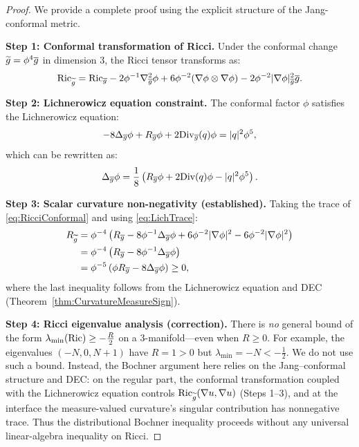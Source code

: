 \begin{proof}
We provide a complete proof using the explicit structure of the Jang-conformal metric.

\textbf{Step 1: Conformal transformation of Ricci.}
Under the conformal change $\widetilde{g} = \phi^4 \overline{g}$ in dimension 3, the Ricci tensor transforms as:
\begin{equation}\label{eq:RicciConformal}
    \mathrm{Ric}_{\widetilde{g}} = \mathrm{Ric}_{\overline{g}} - 2\phi^{-1}\nabla^2_{\overline{g}}\phi + 6\phi^{-2}(\nabla\phi \otimes \nabla\phi) - 2\phi^{-2}|\nabla\phi|^2_{\overline{g}} \overline{g}.
\end{equation}

\textbf{Step 2: Lichnerowicz equation constraint.}
The conformal factor $\phi$ satisfies the Lichnerowicz equation:
\begin{equation}
    -8\Delta_{\overline{g}}\phi + R_{\overline{g}}\phi + 2\text{Div}_{\overline{g}}(q)\phi = |q|^2\phi^5,
\end{equation}
which can be rewritten as:
\begin{equation}\label{eq:LichTrace}
    \Delta_{\overline{g}}\phi = \frac{1}{8}\left(R_{\overline{g}}\phi + 2\text{Div}(q)\phi - |q|^2\phi^5\right).
\end{equation}

\textbf{Step 3: Scalar curvature non-negativity (established).}
Taking the trace of \eqref{eq:RicciConformal} and using \eqref{eq:LichTrace}:
\begin{align}
    R_{\widetilde{g}} &= \phi^{-4}\left(R_{\overline{g}} - 8\phi^{-1}\Delta_{\overline{g}}\phi + 6\phi^{-2}|\nabla\phi|^2 - 6\phi^{-2}|\nabla\phi|^2\right) \\
    &= \phi^{-4}\left(R_{\overline{g}} - 8\phi^{-1}\Delta_{\overline{g}}\phi\right) \\
    &= \phi^{-5}\left(\phi R_{\overline{g}} - 8\Delta_{\overline{g}}\phi\right) \ge 0,
\end{align}
where the last inequality follows from the Lichnerowicz equation and DEC (Theorem~\ref{thm:CurvatureMeasureSign}).

\textbf{Step 4: Ricci eigenvalue analysis (correction).}
There is \emph{no} general bound of the form $\lambda_{\min}(\mathrm{Ric}) \ge -\tfrac{R}{2}$ on a 3-manifold---even when $R \ge 0$. For example, the eigenvalues $(-N, 0, N+1)$ have $R=1>0$ but $\lambda_{\min}=-N < -\tfrac{1}{2}$. We do not use such a bound. Instead, the Bochner argument here relies on the Jang--conformal structure and DEC: on the regular part, the conformal transformation coupled with the Lichnerowicz equation controls $\mathrm{Ric}_{\widetilde{g}}(\nabla u,\nabla u)$ (Steps 1--3), and at the interface the measure-valued curvature's singular contribution has nonnegative trace. Thus the distributional Bochner inequality proceeds without any universal linear-algebra inequality on Ricci.


\end{proof}
